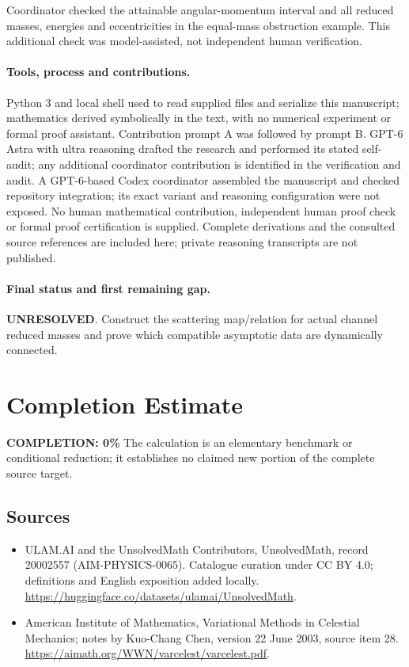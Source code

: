 \documentclass[11pt]{article}
\begin{document}
Coordinator checked the attainable angular-momentum interval and all reduced masses, energies and eccentricities in the equal-mass obstruction example. This additional check was model-assisted, not independent human verification.

\paragraph{Tools, process and contributions.}
Python 3 and local shell used to read supplied files and serialize this manuscript; mathematics derived symbolically in the text, with no numerical experiment or formal proof assistant. Contribution prompt A was followed by prompt B. GPT-6 Astra with ultra reasoning drafted the research and performed its stated self-audit; any additional coordinator contribution is identified in the verification and audit. A GPT-6-based Codex coordinator assembled the manuscript and checked repository integration; its exact variant and reasoning configuration were not exposed. No human mathematical contribution, independent human proof check or formal proof certification is supplied. Complete derivations and the consulted source references are included here; private reasoning transcripts are not published.

\paragraph{Final status and first remaining gap.}
\textbf{UNRESOLVED}. Construct the scattering map/relation for actual channel reduced masses and prove which compatible asymptotic data are dynamically connected.

\section{Completion Estimate}
\noindent\textbf{COMPLETION: 0\%}
The calculation is an elementary benchmark or conditional reduction; it establishes no claimed new portion of the complete source target.

\subsection{Sources}
\begin{itemize}
\item[\hypertarget{source:20002557:1}{S1}] ULAM.AI and the UnsolvedMath Contributors, UnsolvedMath, record 20002557 (AIM-PHYSICS-0065). Catalogue curation under CC BY 4.0; definitions and English exposition added locally.
\url{https://huggingface.co/datasets/ulamai/UnsolvedMath}.
\item[\hypertarget{source:20002557:2}{S2}] American Institute of Mathematics, Variational Methods in Celestial Mechanics; notes by Kuo-Chang Chen, version 22 June 2003, source item 28.
\url{https://aimath.org/WWN/varcelest/varcelest.pdf}.
\end{itemize}
\label{end:20002557}
\end{document}

